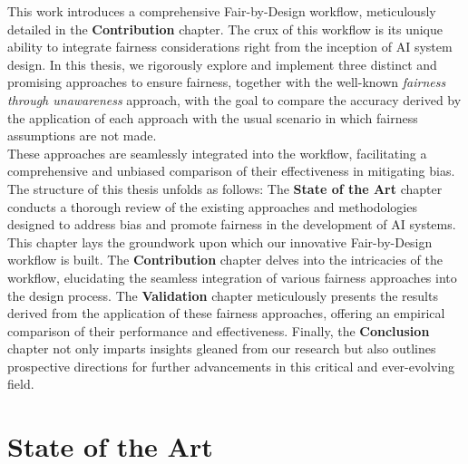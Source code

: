 \documentclass[12pt,a4paper,openright,twoside]{book}
\begin{document}
This work introduces a comprehensive Fair-by-Design workflow, meticulously detailed in the \textbf{Contribution} chapter. The crux of this workflow is its unique ability to integrate fairness considerations right from the inception of AI system design. In this thesis, we rigorously explore and implement three distinct and promising approaches to ensure fairness, together with the well-known \emph{fairness through unawareness} approach, with the goal to compare the accuracy derived by the application of each approach with the usual scenario in which fairness assumptions are not made. \\
These approaches are seamlessly integrated into the workflow, facilitating a comprehensive and unbiased comparison of their effectiveness in mitigating bias. \\
The structure of this thesis unfolds as follows: The \textbf{State of the Art} chapter conducts a thorough review of the existing approaches and methodologies designed to address bias and promote fairness in the development of AI systems. This chapter lays the groundwork upon which our innovative Fair-by-Design workflow is built. The \textbf{Contribution} chapter delves into the intricacies of the workflow, elucidating the seamless integration of various fairness approaches into the design process. The \textbf{Validation} chapter meticulously presents the results derived from the application of these fairness approaches, offering an empirical comparison of their performance and effectiveness. Finally, the \textbf{Conclusion} chapter not only imparts insights gleaned from our research but also outlines prospective directions for further advancements in this critical and ever-evolving field.

\chapter{State of the Art} %
\label{chap:background}
\end{document}
